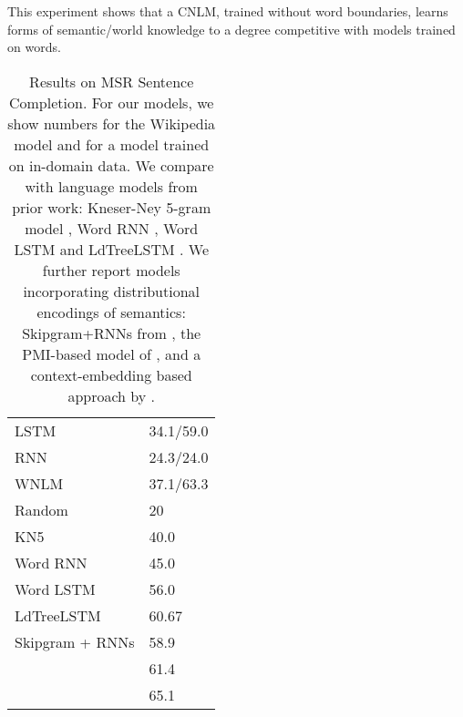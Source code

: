 This experiment shows that a CNLM, trained without word boundaries, learns forms of semantic/world knowledge to a degree competitive with models trained on words.

\begin{table}[t]
  \begin{center}
    \begin{tabular}{l|l}
        LSTM 	    &      34.1/59.0 \\ %
	    RNN  &     24.3/24.0 \\ %
	    WNLM & 37.1/63.3 \\ \hline \hline %
	    Random & 20 \\ \hline
	    KN5   & 40.0 \\
            Word RNN & 45.0 \\
	    Word LSTM & 56.0 \\ 
	    LdTreeLSTM  & 60.67 \\	    \hline
Skipgram + RNNs  & 58.9 \\
            \citet{woods2016exploiting} &  61.4 \\
\citet{melamud2016context2vec} & 65.1 \\
    \end{tabular}
  \end{center}
	\caption{\label{tab:msr-completion-results} Results on MSR Sentence Completion. For our models, we show numbers for the Wikipedia model and for a model trained on in-domain data. We compare with language models from prior work: Kneser-Ney 5-gram model \cite{Mikolov:2012}, Word RNN \cite{zweig2012computational}, Word LSTM and LdTreeLSTM \cite{zhang2016top}. We further report models incorporating distributional encodings of semantics: Skipgram+RNNs from , the PMI-based model of \citet{woods2016exploiting}, and a context-embedding based approach by \citet{melamud2016context2vec}.}
\end{table}



